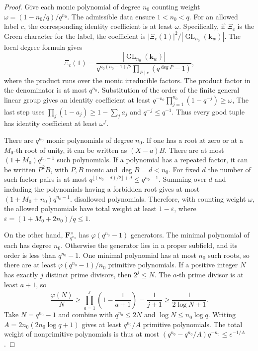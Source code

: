 \begin{proof}
Give each monic polynomial of degree $n_0$ counting weight
$\omega=(1-n_0/q)/q^{n_0}$. The admissible data ensure $1<n_0<q$.
For an allowed label $c$, the corresponding identity coefficient is at least $\omega$.
Specifically, if $\Xi_c$ is the Green character for the label, the coefficient is
$|\Xi_c(1)|^2/|\operatorname{GL}_{n_0}(\mathbf k_w)|$.
The local degree formula gives
\[
 \Xi_c(1)=
 \frac{|\operatorname{GL}_{n_0}(\mathbf k_w)|}
      {q^{n_0(n_0-1)/2}\prod_{P\mid c}(q^{\deg P}-1)} ,
\]
where the product runs over the monic irreducible factors.
The product factor in the denominator is at most $q^{n_0}$.
Substitution of the order of the finite general linear group gives an identity coefficient at least
$q^{-n_0}\prod_{j=1}^{n_0}(1-q^{-j})\ge\omega$,
The last step uses $\prod_j(1-a_j)\ge1-\sum_j a_j$ and $q^{-j}\le q^{-1}$.
Thus every good tuple has identity coefficient at least $\omega^f$.

There are $q^{n_0}$ monic polynomials of degree $n_0$.
If one has a root at zero or at a $M_0$-th root of unity, it can be written as $(X-a)B$.
There are at most $(1+M_0)q^{n_0-1}$ such polynomials.
If a polynomial has a repeated factor, it can be written $P^2B$, with $P,B$ monic and $\deg B=d<n_0$.
For fixed $d$ the number of such factor pairs is at most
$q^{\lfloor(n_0-d)/2\rfloor+d}\le q^{n_0-1}$.
Summing over $d$ and including the polynomials having a forbidden root gives at most
$(1+M_0+n_0)q^{n_0-1}$.
disallowed polynomials. Therefore, with counting weight $\omega$, the allowed polynomials have total weight at least $1-\varepsilon$,
where $\varepsilon=(1+M_0+2n_0)/q\le1$.

On the other hand, $\mathbf F_{q^{n_0}}^\times$ has $\varphi(q^{n_0}-1)$ generators.
The minimal polynomial of each has degree $n_0$. Otherwise the generator lies in a proper subfield,
and its order is less than $q^{n_0}-1$. One minimal polynomial has at most $n_0$ such roots,
so there are at least $\varphi(q^{n_0}-1)/n_0$ primitive polynomials.
If a positive integer $N$ has exactly $j$ distinct prime divisors, then $2^j\le N$. The $a$-th prime divisor is at least $a+1$, so
\[
 \frac{\varphi(N)}{N}\ge
   \prod_{a=1}^j\left(1-\frac1{a+1}\right)=\frac1{j+1}
   \ge\frac1{2\log N+1}.
\]
Take $N=q^{n_0}-1$ and combine with $q^{n_0}\le2N$ and $\log N\le n_0\log q$.
Writing $A=2n_0(2n_0\log q+1)$ gives at least $q^{n_0}/A$ primitive polynomials.
The total weight of nonprimitive polynomials is thus at most
$(q^{n_0}-q^{n_0}/A)q^{-n_0}\le e^{-1/A}$.


\end{proof}
